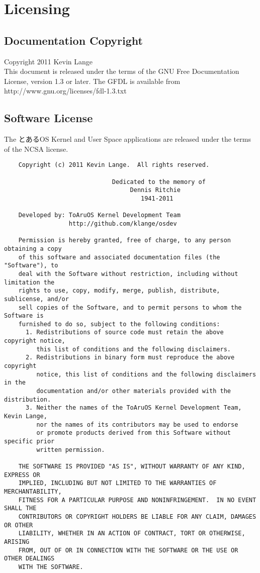 \section{Licensing}

\subsection{Documentation Copyright}

Copyright 2011 Kevin Lange \\
This document is released under the terms of the GNU Free Documentation License, version 1.3 or later.
The GFDL is available from http://www.gnu.org/licenses/fdl-1.3.txt


\subsection{Software License}

The とあるOS Kernel and User Space applications are released under the terms of the NCSA license.

\begin{verbatim}
    Copyright (c) 2011 Kevin Lange.  All rights reserved.

                              Dedicated to the memory of
                                   Dennis Ritchie
                                      1941-2011

    Developed by: ToAruOS Kernel Development Team
                  http://github.com/klange/osdev

    Permission is hereby granted, free of charge, to any person obtaining a copy
    of this software and associated documentation files (the "Software"), to
    deal with the Software without restriction, including without limitation the
    rights to use, copy, modify, merge, publish, distribute, sublicense, and/or
    sell copies of the Software, and to permit persons to whom the Software is
    furnished to do so, subject to the following conditions:
      1. Redistributions of source code must retain the above copyright notice,
         this list of conditions and the following disclaimers.
      2. Redistributions in binary form must reproduce the above copyright
         notice, this list of conditions and the following disclaimers in the
         documentation and/or other materials provided with the distribution.
      3. Neither the names of the ToAruOS Kernel Development Team, Kevin Lange,
         nor the names of its contributors may be used to endorse
         or promote products derived from this Software without specific prior
         written permission.

    THE SOFTWARE IS PROVIDED "AS IS", WITHOUT WARRANTY OF ANY KIND, EXPRESS OR
    IMPLIED, INCLUDING BUT NOT LIMITED TO THE WARRANTIES OF MERCHANTABILITY,
    FITNESS FOR A PARTICULAR PURPOSE AND NONINFRINGEMENT.  IN NO EVENT SHALL THE
    CONTRIBUTORS OR COPYRIGHT HOLDERS BE LIABLE FOR ANY CLAIM, DAMAGES OR OTHER
    LIABILITY, WHETHER IN AN ACTION OF CONTRACT, TORT OR OTHERWISE, ARISING
    FROM, OUT OF OR IN CONNECTION WITH THE SOFTWARE OR THE USE OR OTHER DEALINGS
    WITH THE SOFTWARE.
\end{verbatim}

